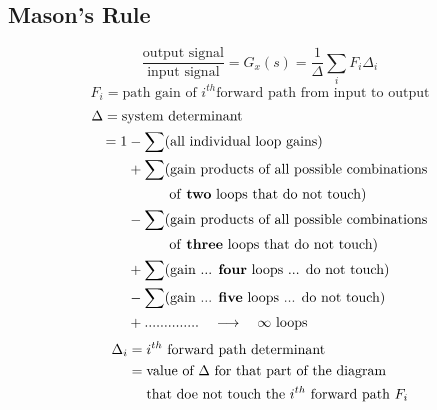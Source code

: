 \documentclass[twocolumn, 12pt]{article}    %
\begin{document}
\subsection*{Mason's Rule}
\begin{equation*}
    \frac{\text{output signal}}{\text{input signal}} = G_x(s) = \frac{1}{\Delta} \sum_i F_i\Delta_i
\end{equation*}
\begin{equation*}
    F_i = \text{path gain of } i^{th} \text{forward path from input to output} 
\end{equation*}
\begin{align*}
    \Delta = \text{s}&\text{ystem determinant}\\
            = 1 &- \sum (\text{all individual loop gains})\\
            & +\sum (\text{gain products of all possible combinations}\\
            & \text{\hspace{30pt}of \textbf{two} loops that do not touch})\\
            & -\sum (\text{gain products of all possible combinations}\\
            & \text{\hspace{30pt}of \textbf{three} loops that do not touch})\\
            & +\sum (\text{gain ... \textbf{four} loops ... do not touch})\\
            & -\sum (\text{gain ... \textbf{five} loops ... do not touch})\\
            & + .............. \hspace{10pt} \longrightarrow \hspace{10pt} \infty \text{ loops}\\
\end{align*}
\vspace{-40pt}
\begin{align*}
    \Delta_i &= i^{th}\text{ forward path determinant}\\
            &= \text{value of }\Delta \text{ for that part of the diagram}\\
            & \text{\hspace{10pt} that doe not touch the }i^{th} \text{ forward path }F_i
\end{align*}
\end{document}
